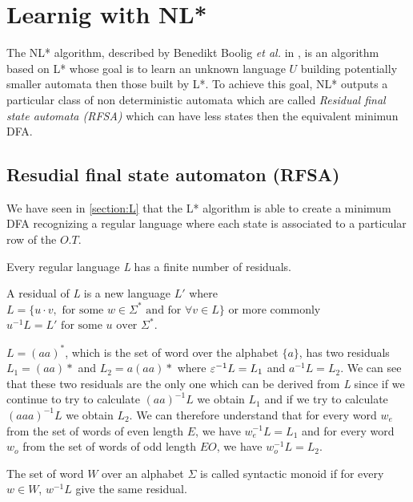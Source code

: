 \section{Learnig with NL* }

The NL* algorithm, described by Benedikt Boolig \textit{et al.} in \cite{NLPaper}, is an algorithm based on L* whose goal is to learn an unknown language $U$ building potentially smaller automata then those built by L*. To achieve this goal, NL* outputs a particular class of non deterministic automata which are called \textit{Residual final state automata (RFSA)} which can have less states then the equivalent minimun DFA.

\subsection{Resudial final state automaton (RFSA)}
\label{sec:RFSA}

We have seen in \cref{section:L} that the L* algorithm is able to create a minimum DFA recognizing a regular language where each state is associated to a particular row of the $O.T$.

\begin{theorem}
  Every regular language \textit{L} has a finite number of residuals.
\end{theorem}

A residual of \textit{L} is a new language $L'$ where $L = \{u \cdot v, \text{ for some } w \in \Sigma^* \text{ and for } \forall v \in L\}$ or more commonly $u^{-1} L = L' \text{ for some } u \text{ over } \Sigma^*$.

\begin{example}
  \label{example:residual}
  $L = (aa)^*$, which is the set of word over the alphabet $\{a\}$, has two residuals $L_1 = (aa)*$ and $L_2 = a(aa)*$ where ${\varepsilon}^{-1} L = L_1$ and $a^{-1}L = L_2$. We can see that these two residuals are the only one which can be derived from \textit{L} since if we continue to try to calculate $(aa)^{-1}L$ we obtain $L_1$ and if we try to calculate $(aaa)^{-1}L$ we obtain $L_2$. We can therefore understand that for every word $w_e$ from the set of words of even length $E$, we have $w_e^{-1}L = L_1$ and for every word $w_o$ from the set of words of odd length $EO$, we have $w_o^{-1}L = L_2$.
\end{example}

\begin{definition}
  \label{def:monoid}
  The set of word $W$ over an alphabet $\Sigma$ is called syntactic monoid if for every $w \in W$, $w^{-1}L$ give the same residual.
\end{definition}

